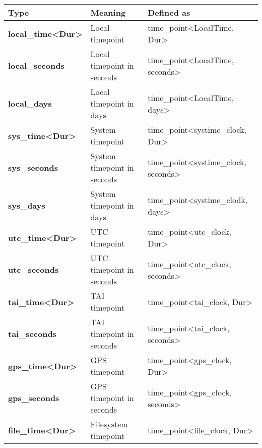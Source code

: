 \begin{longtable}[c]{|l|l|l|}
\hline
\textbf{Type}                                  & \textbf{Meaning}            & \textbf{Defined as}                                         \\ \hline
\endfirsthead
%
\endhead
%
\textbf{local\_time\textless{}Dur\textgreater{}} & Local timepoint      & time\_point\textless{}LocalTime, Dur\textgreater{}      \\ \hline
\textbf{local\_seconds}                        & Local timepoint in seconds  & time\_point\textless{}LocalTime, seconds\textgreater{}      \\ \hline
\textbf{local\_days}                           & Local timepoint in days     & time\_point\textless{}LocalTime, days\textgreater{}         \\ \hline
\textbf{sys\_time\textless{}Dur\textgreater{}}   & System timepoint     & time\_point\textless{}systime\_clock, Dur\textgreater{} \\ \hline
\textbf{sys\_seconds}                          & System timepoint in seconds & time\_point\textless{}systime\_clock, seconds\textgreater{} \\ \hline
\textbf{sys\_days}                             & System timepoint in days    & time\_point\textless{}systime\_clodk, days\textgreater{}    \\ \hline
\textbf{utc\_time\textless{}Dur\textgreater{}} & UTC timepoint               & time\_point\textless{}utc\_clock, Dur\textgreater{}         \\ \hline
\textbf{utc\_seconds}                          & UTC timepoint in seconds    & time\_point\textless{}utc\_clock, seconds\textgreater{}     \\ \hline
\textbf{tai\_time\textless{}Dur\textgreater{}} & TAI timepoint               & time\_point\textless{}tai\_clock, Dur\textgreater{}         \\ \hline
\textbf{tai\_seconds}                          & TAI timepoint in seconds    & time\_point\textless{}tai\_clock, seconds\textgreater{}     \\ \hline
\textbf{gps\_time\textless{}Dur\textgreater{}} & GPS timepoint               & time\_point\textless{}gps\_clock, Dur\textgreater{}         \\ \hline
\textbf{gps\_seconds}                          & GPS timepoint in seconds    & time\_point\textless{}gps\_clock, seconds\textgreater{}     \\ \hline
\textbf{file\_time\textless{}Dur\textgreater{}}  & Filesystem timepoint & time\_point\textless{}file\_clock, Dur\textgreater{}    \\ \hline
\end{longtable}

